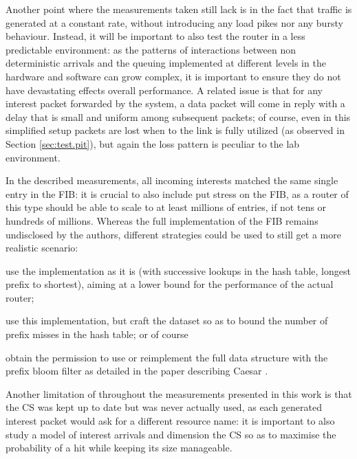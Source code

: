 \documentclass[11pt,a4paper,twoside,titlepage,openany]{book}
\begin{document}
Another point where the measurements taken still lack is in the fact that traffic is generated at a constant rate, without introducing any load pikes nor any bursty behaviour. Instead, it will be important to also test the router in a less predictable environment: as the patterns of interactions between non deterministic arrivals and the queuing implemented at different levels in the hardware and software can grow complex, it is important to ensure they do not have devastating effects overall performance.
A related issue is that for any interest packet forwarded by the system, a data packet will come in reply with a delay that is small and uniform among subsequent packets; of course, even in this simplified setup packets are lost when to the link is fully utilized (as observed in Section \ref{sec:test.pit}), but again the loss pattern is peculiar to the lab environment.

In the described measurements, all incoming interests matched the same single entry in the FIB: it is crucial to also include put stress on the FIB, as a router of this type should be able to scale to at least millions of entries, if not tens or hundreds of millions. Whereas the full implementation of the FIB remains undisclosed by the authors, different strategies could be used to still get a more realistic scenario: 
\begin{inlineenum}\item use the implementation as it is (with successive lookups in the hash table, longest prefix to shortest), aiming at a lower bound for the performance of the actual router; \item use this implementation, but craft the dataset so as to bound the number of prefix misses in the hash table; or of course \item obtain the permission to use or reimplement the full data structure with the prefix bloom filter as detailed in the paper describing Caesar \cite{caesar}.\end{inlineenum}

Another limitation of throughout the measurements presented in this work is that the \gls{CS} was kept up to date but was never actually used, as each generated interest packet would ask for a different resource name: it is important to also study a model of interest arrivals and dimension the CS so as to maximise the probability of a hit while keeping its size manageable.


\end{document}

